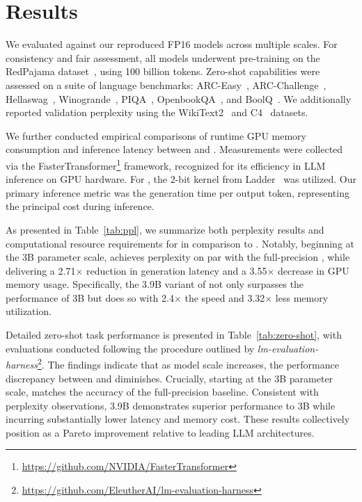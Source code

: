 \section{Results}

We evaluated  against our reproduced FP16  models across multiple scales. For consistency and fair assessment, all models underwent pre-training on the RedPajama dataset~\cite{redpajama}, using 100 billion tokens. Zero-shot capabilities were assessed on a suite of language benchmarks: ARC-Easy~\cite{arc}, ARC-Challenge~\cite{arc}, Hellaswag~\cite{hellaswag}, Winogrande~\cite{winoGrande}, PIQA~\cite{piqa}, OpenbookQA~\cite{openbookqa}, and BoolQ~\cite{boolq}. We additionally reported validation perplexity using the WikiText2~\cite{wikitext2} and C4~\cite{c4} datasets.

We further conducted empirical comparisons of runtime GPU memory consumption and inference latency between  and . Measurements were collected via the FasterTransformer\footnote{\url{https://github.com/NVIDIA/FasterTransformer}} framework, recognized for its efficiency in LLM inference on GPU hardware. For , the 2-bit kernel from Ladder~\cite{ladder} was utilized. Our primary inference metric was the generation time per output token, representing the principal cost during inference.

As presented in Table~\ref{tab:ppl}, we summarize both perplexity results and computational resource requirements for  in comparison to . Notably, beginning at the 3B parameter scale,  achieves perplexity on par with the full-precision , while delivering a 2.71$\times$ reduction in generation latency and a 3.55$\times$ decrease in GPU memory usage. Specifically, the 3.9B variant of  not only surpasses the performance of  3B but does so with 2.4$\times$ the speed and 3.32$\times$ less memory utilization.

Detailed zero-shot task performance is presented in Table~\ref{tab:zero-shot}, with evaluations conducted following the procedure outlined by \emph{lm-evaluation-harness}\footnote{\url{https://github.com/EleutherAI/lm-evaluation-harness}}. The findings indicate that as model scale increases, the performance discrepancy between  and  diminishes. Crucially, starting at the 3B parameter scale,  matches the accuracy of the full-precision baseline. Consistent with perplexity observations,  3.9B demonstrates superior performance to  3B while incurring substantially lower latency and memory cost. These results collectively position  as a Pareto improvement relative to leading LLM architectures.

